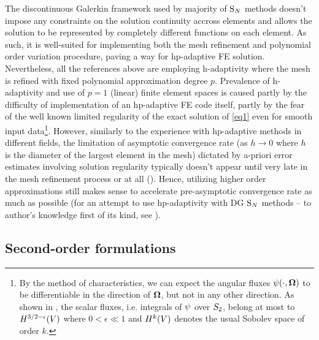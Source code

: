 The discontinuous Galerkin framework used by majority of $\text{S}_{N}$ methods doesn't impose any constraints on the solution
continuity accross elements and allows the solution to be represented by completely different functions on each element.
As such, it is well-suited for implementing both the mesh refinement and polynomial order variation procedure, paving a
way for hp-adaptive FE solution.
Nevertheless, all the references above are employing h-adaptivity where the mesh is refined with fixed polynomial
approximation degree $p$. Prevalence of h-adaptivity and use of $p=1$ (linear) finite element spaces is caused partly
by the difficulty of implementation of an hp-adaptive FE code itself, partly by the fear of the well known limited
regularity of the exact solution of \eqref{eq1} even for smooth input data\footnote{By the method of characteristics, we
can expect the angular fluxes $\psi(\cdot,\mathbf{\Omega})$ to be differentiable in the direction of $\mathbf{\Omega}$, but not in
any other direction. As shown in \cite{Johnson}, the scalar fluxes, i.e. integrals of $\psi$ over $S_2$, belong
at most to $H^{3/2-\epsilon}(V)$ where $0 < \epsilon \ll 1$ and $H^{k}(V)$ denotes the usual Sobolev space of order
$k$.}.
However, similarly to the experience with hp-adaptive methods in different fields, the limitation of asymptotic
convergence rate (as $h\to 0$ where $h$ is the diameter of the largest element in the mesh) dictated by a-priori error
estimates involving solution regularity typically doesn't appear until very late in the mesh refinement process or at
all (\cite{wang2009convergence}). Hence, utilizing higher order approximations still makes sense to accelerate
pre-asymptotic convergence rate as much as possible (for an attempt to use hp-adaptivity with DG $\text{S}_{N}$ methods -- to
author's knowledge first of its kind, see \cite{FournierDGHP}).





  

\subsection{Second-order formulations}

